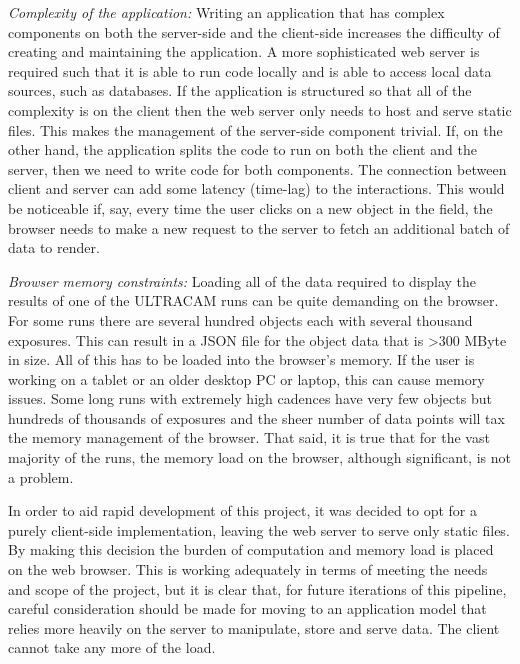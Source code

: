 \emph{Complexity of the application:} Writing an application that has complex components on both the server-side and the client-side increases the difficulty of creating and maintaining the application. A more sophisticated web server is required such that it is able to run code locally and is able to access local data sources, such as databases. If the application is structured so that all of the complexity is on the client then the web server only needs to host and serve static files. This makes the management of the server-side component trivial. If, on the other hand, the application splits the code to run on both the client and the server, then we need to write code for both components. The connection between client and server can add some latency (time-lag) to the interactions. This would be noticeable if, say, every time the user clicks on a new object in the field, the browser needs to make a new request to the server to fetch an additional batch of data to render.  

\emph{Browser memory constraints:} Loading all of the data required to display the results of one of the ULTRACAM runs can be quite demanding on the browser. For some runs there are several hundred objects each with several thousand exposures. This can result in a JSON file for the object data that is \textgreater 300 MByte in size. All of this has to be loaded into the browser's memory. If the user is working on a tablet or an older desktop PC or laptop, this can cause memory issues. Some long runs with extremely high cadences have very few objects but hundreds of thousands of exposures and the sheer number of data points will tax the memory management of the browser. That said, it is true that for the vast majority of the runs, the memory load on the browser, although significant, is not a problem. 

In order to aid rapid development of this project, it was decided to opt for a purely client-side implementation, leaving the web server to serve only static files. By making this decision the burden of computation and memory load is placed on the web browser. This is working adequately in terms of meeting the needs and scope of the project, but it is clear that, for future iterations of this pipeline, careful consideration should be made for moving to an application model that relies more heavily on the server to manipulate, store and serve data. The client cannot take any more of the load. 

